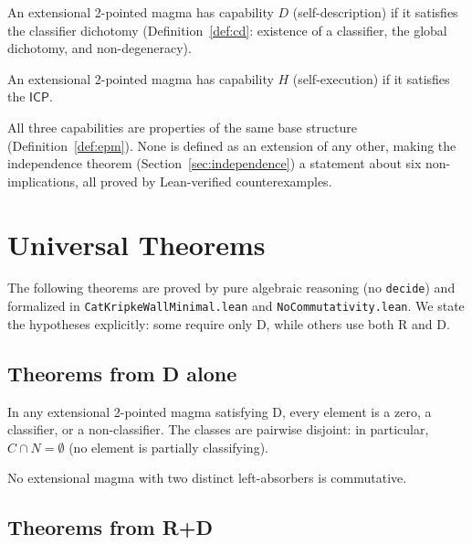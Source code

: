 \documentclass[sigconf,screen,review,anonymous]{acmart}
\newcommand{\ICP}{\textsf{ICP}}
\theoremstyle{remark}
\begin{document}
\begin{definition}[Capability D]
An extensional 2-pointed magma has capability $D$ (self-description) if it satisfies the classifier dichotomy (Definition~\ref{def:cd}: existence of a classifier, the global dichotomy, and non-degeneracy).
\end{definition}

\begin{definition}[Capability H]
An extensional 2-pointed magma has capability $H$ (self-execution) if it satisfies the $\ICP$.
\end{definition}

All three capabilities are properties of the same base structure (Definition~\ref{def:epm}). None is defined as an extension of any other, making the independence theorem (Section~\ref{sec:independence}) a statement about six non-implications, all proved by Lean-verified counterexamples.

\section{Universal Theorems}
\label{sec:universal}

The following theorems are proved by pure algebraic reasoning (no \texttt{decide}) and formalized in \texttt{CatKripkeWallMinimal.lean} and \texttt{NoCommutativity.lean}. We state the hypotheses explicitly: some require only D, while others use both R and D.

\subsection{Theorems from D alone}

\begin{theorem}
\label{thm:three-cat}
In any extensional 2-pointed magma satisfying D, every element is a zero, a classifier, or a non-classifier. The classes are pairwise disjoint: in particular, $C \cap N = \emptyset$ (no element is partially classifying).
\end{theorem}

\begin{theorem}[Asymmetry]
\label{thm:asymmetry}
No extensional magma with two distinct left-absorbers is commutative.
\end{theorem}

\subsection{Theorems from R+D}
\end{document}
